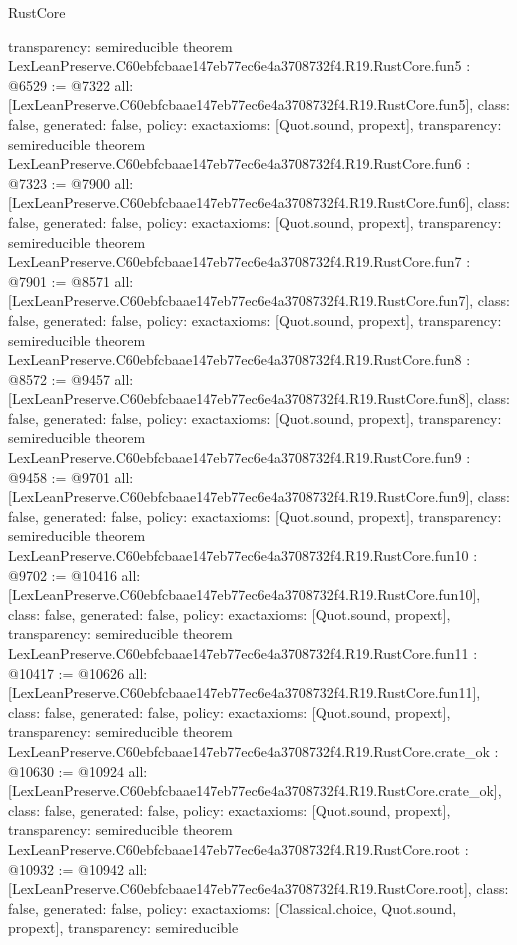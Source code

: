 \begin{lexlean}{RustCore}
\begin{coremodule}
{  transparency: semireducible
}
theorem LexLeanPreserve.C60ebfcbaae147eb77ec6e4a3708732f4.R19.RustCore.fun5 : @6529 := @7322 {
  all: [LexLeanPreserve.C60ebfcbaae147eb77ec6e4a3708732f4.R19.RustCore.fun5],
  class: false,
  generated: false,
  policy: exact{axioms: [Quot.sound, propext]},
  transparency: semireducible
}
theorem LexLeanPreserve.C60ebfcbaae147eb77ec6e4a3708732f4.R19.RustCore.fun6 : @7323 := @7900 {
  all: [LexLeanPreserve.C60ebfcbaae147eb77ec6e4a3708732f4.R19.RustCore.fun6],
  class: false,
  generated: false,
  policy: exact{axioms: [Quot.sound, propext]},
  transparency: semireducible
}
theorem LexLeanPreserve.C60ebfcbaae147eb77ec6e4a3708732f4.R19.RustCore.fun7 : @7901 := @8571 {
  all: [LexLeanPreserve.C60ebfcbaae147eb77ec6e4a3708732f4.R19.RustCore.fun7],
  class: false,
  generated: false,
  policy: exact{axioms: [Quot.sound, propext]},
  transparency: semireducible
}
theorem LexLeanPreserve.C60ebfcbaae147eb77ec6e4a3708732f4.R19.RustCore.fun8 : @8572 := @9457 {
  all: [LexLeanPreserve.C60ebfcbaae147eb77ec6e4a3708732f4.R19.RustCore.fun8],
  class: false,
  generated: false,
  policy: exact{axioms: [Quot.sound, propext]},
  transparency: semireducible
}
theorem LexLeanPreserve.C60ebfcbaae147eb77ec6e4a3708732f4.R19.RustCore.fun9 : @9458 := @9701 {
  all: [LexLeanPreserve.C60ebfcbaae147eb77ec6e4a3708732f4.R19.RustCore.fun9],
  class: false,
  generated: false,
  policy: exact{axioms: [Quot.sound, propext]},
  transparency: semireducible
}
theorem LexLeanPreserve.C60ebfcbaae147eb77ec6e4a3708732f4.R19.RustCore.fun10 : @9702 := @10416 {
  all: [LexLeanPreserve.C60ebfcbaae147eb77ec6e4a3708732f4.R19.RustCore.fun10],
  class: false,
  generated: false,
  policy: exact{axioms: [Quot.sound, propext]},
  transparency: semireducible
}
theorem LexLeanPreserve.C60ebfcbaae147eb77ec6e4a3708732f4.R19.RustCore.fun11 : @10417 := @10626 {
  all: [LexLeanPreserve.C60ebfcbaae147eb77ec6e4a3708732f4.R19.RustCore.fun11],
  class: false,
  generated: false,
  policy: exact{axioms: [Quot.sound, propext]},
  transparency: semireducible
}
theorem LexLeanPreserve.C60ebfcbaae147eb77ec6e4a3708732f4.R19.RustCore.crate_ok : @10630 := @10924 {
  all: [LexLeanPreserve.C60ebfcbaae147eb77ec6e4a3708732f4.R19.RustCore.crate_ok],
  class: false,
  generated: false,
  policy: exact{axioms: [Quot.sound, propext]},
  transparency: semireducible
}
theorem LexLeanPreserve.C60ebfcbaae147eb77ec6e4a3708732f4.R19.RustCore.root : @10932 := @10942 {
  all: [LexLeanPreserve.C60ebfcbaae147eb77ec6e4a3708732f4.R19.RustCore.root],
  class: false,
  generated: false,
  policy: exact{axioms: [Classical.choice, Quot.sound, propext]},
  transparency: semireducible
}


\end{coremodule}
\end{lexlean}
